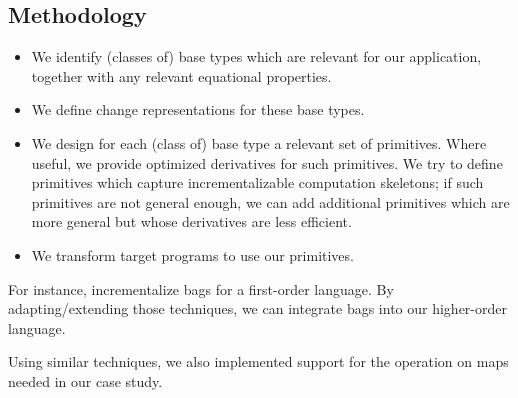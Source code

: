   \begin{oldSec}
\section{Methodology}
\label{ssec:methodology}


\begin{itemize}
\item We identify (classes of) base types which are relevant for
  our application, together with any relevant equational properties.
\item We define change representations for these base
  types.
\item We design for each (class of) base type a relevant set of
  primitives.  Where
  useful, we provide optimized derivatives for such primitives.
  We try to define primitives which capture
  incrementalizable computation skeletons; if such primitives are
  not general enough, we can add additional primitives which are
  more general but whose derivatives are less efficient.
\item We transform target programs to use our primitives.
\end{itemize}

For instance, \citet{GlucheGrust97Incr} incrementalize bags for a
first-order language. By adapting/extending those techniques, we
can integrate bags into our higher-order language.

Using similar techniques, we also implemented support for the
operation on maps needed in our case study.

\end{oldSec}



